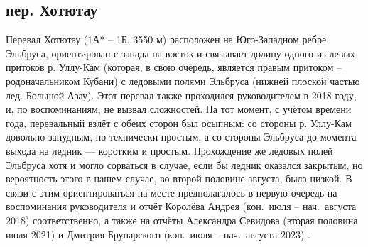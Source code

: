 \subsection{пер. Хотютау} 
Перевал Хотютау (1А* -- 1Б, 3550 м) расположен на Юго-Западном ребре Эльбруса, ориентирован с запада на восток и связывает долину одного из левых притоков р. Уллу-Кам (которая, в свою очередь, является правым притоком -- родоначальником Кубани) с ледовыми полями Эльбруса (нижней плоской частью лед. Большой Азау). Этот перевал также проходился руководителем в 2018 году, и, по воспоминаниям, не вызвал сложностей. На тот момент, с учётом времени года, перевальный взлёт с обеих сторон был осыпным: со стороны р. Уллу-Кам довольно занудным, но технически простым, а со стороны Эльбруса до момента выхода на ледник --- коротким и простым. Прохождение же ледовых полей Эльбруса хотя и могло сорваться в случае, если бы ледник оказался закрытым, но вероятность этого в нашем случае, во второй половине августа, была низкой. В связи с этим ориентироваться на месте предполагалось в первую очередь на воспоминания руководителя и отчёт Королёва Андрея (кон.~июля -- нач.~августа 2018) \cite{Korolyov2018} соответственно, а также на отчёты Александра Севидова (вторая половина июля 2021) \cite{Sevidov2021} и Дмитрия Брунарского (кон.~июля -- нач.~августа 2023) \cite{Brunarsky2023}.